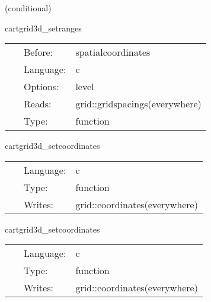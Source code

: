 \vspace{5mm}

   (conditional) 

\hspace{5mm} cartgrid3d\_setranges 

\hspace{5mm}{\it set up ranges for spatial 3d cartesian coordinates (on first level) } 


\hspace{5mm}

 \begin{tabular*}{160mm}{cll} 
~ & Before:  & spatialcoordinates \\ 
~ & Language:  & c \\ 
~ & Options:  & level \\ 
~ & Reads:  & grid::gridspacings(everywhere) \\ 
~ & Type:  & function \\ 
\end{tabular*} 


\vspace{5mm}


\hspace{5mm} cartgrid3d\_setcoordinates 

\hspace{5mm}{\it set up spatial 3d cartesian coordinates on the gh } 


\hspace{5mm}

 \begin{tabular*}{160mm}{cll} 
~ & Language:  & c \\ 
~ & Type:  & function \\ 
~ & Writes:  & grid::coordinates(everywhere) \\ 
\end{tabular*} 


\vspace{5mm}


\hspace{5mm} cartgrid3d\_setcoordinates 

\hspace{5mm}{\it set coordinates after regridding } 


\hspace{5mm}

 \begin{tabular*}{160mm}{cll} 
~ & Language:  & c \\ 
~ & Type:  & function \\ 
~ & Writes:  & grid::coordinates(everywhere) \\ 
\end{tabular*} 


